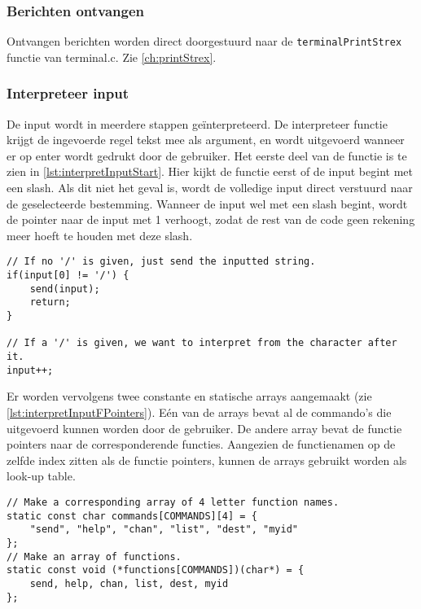 \subsubsection{Berichten ontvangen} \label{ch:messageReceive}
Ontvangen berichten worden direct doorgestuurd naar de \texttt{terminalPrintStrex} functie van terminal.c. Zie \autoref{ch:printStrex}.

\subsubsection{Interpreteer input} \label{ch:interpreter}

De input wordt in meerdere stappen geïnterpreteerd. De interpreteer functie krijgt de ingevoerde regel tekst mee als argument, en wordt uitgevoerd wanneer er op enter wordt gedrukt door de gebruiker.
Het eerste deel van de functie is te zien in \autoref{lst:interpretInputStart}. Hier kijkt de functie eerst of de input begint met een slash. Als dit niet het geval is, wordt de volledige input direct verstuurd naar de geselecteerde bestemming. Wanneer de input wel met een slash begint, wordt de pointer naar de input met 1 verhoogt, zodat de rest van de code geen rekening meer hoeft te houden met deze slash.

\begin{lstlisting}[caption={Eerste deel van de interpreter},captionpos=b,label={lst:interpretInputStart},style=c,xleftmargin=.\textwidth,xrightmargin=.\textwidth]
// If no '/' is given, just send the inputted string.
if(input[0] != '/') {
    send(input);
    return;
}

// If a '/' is given, we want to interpret from the character after it.
input++;
\end{lstlisting}

Er worden vervolgens twee constante en statische arrays aangemaakt (zie \autoref{lst:interpretInputFPointers}). Eén van de arrays bevat al de commando's die uitgevoerd kunnen worden door de gebruiker. De andere array bevat de functie pointers naar de corresponderende functies.
Aangezien de functienamen op de zelfde index zitten als de functie pointers, kunnen de arrays gebruikt worden als look-up table.

\begin{lstlisting}[caption={De look-up table van de interpreter},captionpos=b,label={lst:interpretInputFPointers},style=c,xleftmargin=.\textwidth,xrightmargin=.\textwidth]
// Make a corresponding array of 4 letter function names.
static const char commands[COMMANDS][4] = {
    "send", "help", "chan", "list", "dest", "myid"
};
// Make an array of functions.
static const void (*functions[COMMANDS])(char*) = {
    send, help, chan, list, dest, myid
};
\end{lstlisting}

